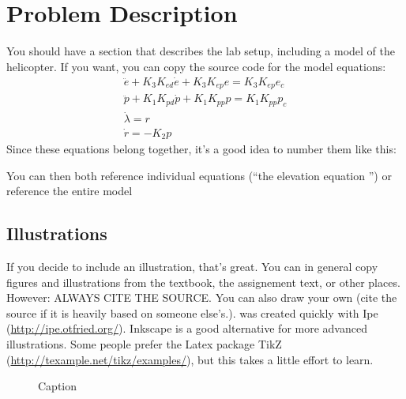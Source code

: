 \section{Problem Description}\label{sec:prob_descr}
You should have a section that describes the lab setup, including a model of the helicopter. If you want, you can copy the source code for the model equations:
\begin{gather}
	\ddot{e} + K_{3} K_{ed} \dot{e} + K_{3} K_{ep} e = K_{3} K_{ep} e_{c} \label{eq:model_elev} \\
	\ddot{p} + K_{1} K_{pd} \dot{p} + K_{1} K_{pp} p = K_{1} K_{pp} p_{c} \label{eq:model_pitch} \\
	\dot{\lambda} = r \label{eq:model_lambda} \\
	\dot{r} = -K_{2} p \label{eq:model_r} 
\end{gather}
Since these equations belong together, it's a good idea to number them like this:

You can then both reference individual equations (``the elevation equation '') or reference the entire model 



\subsection{Illustrations}
If you decide to include an illustration, that's great. You can in general copy figures and illustrations from the textbook, the assignement text, or other places. However: ALWAYS CITE THE SOURCE\@. \cite{Nocedal2006} You can also draw your own (cite the source if it is heavily based on someone else's.).  was created quickly with Ipe (\url{http://ipe.otfried.org/}). Inkscape is a good alternative for more advanced illustrations. Some people prefer the Latex package TikZ (\url{http://texample.net/tikz/examples/}), but this takes a little effort to learn.


\begin{figure}
    \centering
    
    \caption{Caption}
\end{figure}